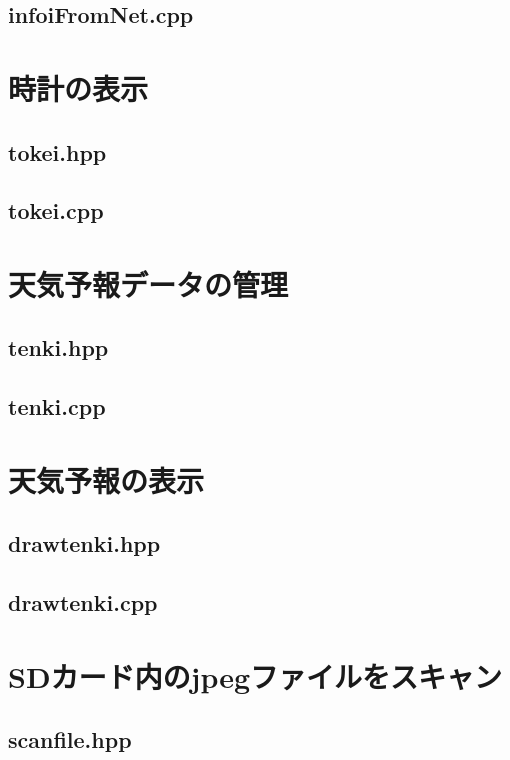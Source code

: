 \documentclass[a4paper, 10pt]{ltjsarticle}
\begin{document}
\subsection{infoiFromNet.cpp}

\clearpage

\section{時計の表示}
\subsection{tokei.hpp}

\subsection{tokei.cpp}

\clearpage

\section{天気予報データの管理}
\subsection{tenki.hpp}

\subsection{tenki.cpp}

\clearpage

\section{天気予報の表示}
\subsection{drawtenki.hpp}

\subsection{drawtenki.cpp}

\clearpage

\section{SDカード内のjpegファイルをスキャン}
\subsection{scanfile.hpp}

\end{document}
